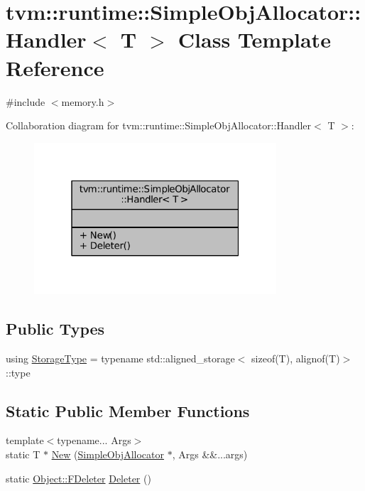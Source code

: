 \hypertarget{classtvm_1_1runtime_1_1SimpleObjAllocator_1_1Handler}{}\section{tvm\+:\+:runtime\+:\+:Simple\+Obj\+Allocator\+:\+:Handler$<$ T $>$ Class Template Reference}
\label{classtvm_1_1runtime_1_1SimpleObjAllocator_1_1Handler}


{\ttfamily \#include $<$memory.\+h$>$}



Collaboration diagram for tvm\+:\+:runtime\+:\+:Simple\+Obj\+Allocator\+:\+:Handler$<$ T $>$\+:
\nopagebreak
\begin{figure}[H]
\begin{center}
\leavevmode
\includegraphics[width=256pt]{classtvm_1_1runtime_1_1SimpleObjAllocator_1_1Handler__coll__graph}
\end{center}
\end{figure}
\subsection*{Public Types}
\begin{DoxyCompactItemize}
\item 
using \hyperlink{classtvm_1_1runtime_1_1SimpleObjAllocator_1_1Handler_ada6a65394767c674dbbfb5937ef51bd6}{Storage\+Type} = typename std\+::aligned\+\_\+storage$<$ sizeof(T), alignof(T)$>$\+::type
\end{DoxyCompactItemize}
\subsection*{Static Public Member Functions}
\begin{DoxyCompactItemize}
\item 
{\footnotesize template$<$typename... Args$>$ }\\static T $\ast$ \hyperlink{classtvm_1_1runtime_1_1SimpleObjAllocator_1_1Handler_af605b9c8534aa0731632f8dd9d32327d}{New} (\hyperlink{classtvm_1_1runtime_1_1SimpleObjAllocator}{Simple\+Obj\+Allocator} $\ast$, Args \&\&...args)
\item 
static \hyperlink{classtvm_1_1runtime_1_1Object_a9e84841ca982bff376a978ade0132631}{Object\+::\+F\+Deleter} \hyperlink{classtvm_1_1runtime_1_1SimpleObjAllocator_1_1Handler_ad2425c09e13c317ab96e728ee6cd4065}{Deleter} ()
\end{DoxyCompactItemize}


